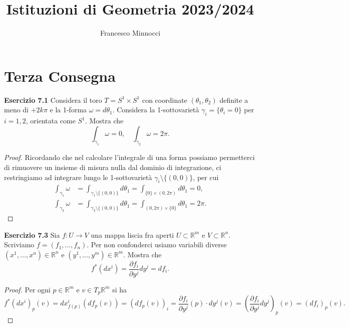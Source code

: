 \documentclass[a4paper]{article}
\title{Istituzioni di Geometria 2023/2024}
\author{Francesco Minnocci}
\newcommand{\R}{\mathbb{R}}
\theoremstyle{definition}
\theoremstyle{definition}
\theoremstyle{remark}
\theoremstyle{definition}
\begin{document}
\maketitle
\section*{Terza Consegna}
\textbf{Esercizio 7.1}
Considera il toro $T = S^1 \times S^1$ con coordinate $(\theta_1, \theta_2)$ definite a meno di $+2k\pi$ e la 1-forma $\omega = d\theta_1$. Considera la 1-sottovarietà $\gamma_i = \{\theta_i = 0\}$ per $i = 1, 2$, orientata come $S^1$. Mostra che
\[
    \int_{\gamma_1} \omega = 0,\quad\int_{\gamma_2} \omega = 2\pi.
\]

\begin{proof}
    Ricordando che nel calcolare l'integrale di una forma possiamo permetterci di rimuovere un insieme di misura nulla dal dominio di integrazione, ci restringiamo ad integrare lungo le 1-sottovarietà $\gamma_i \setminus \{(0, 0)\}$, per cui
    \[
        \begin{aligned}
            \int_{\gamma_1} \omega & = \int_{\gamma_1 \setminus \{(0, 0)\}} d\theta_1 = \int_{\{0\} \times (0, 2\pi)} d\theta_1 = 0,    \\
            \int_{\gamma_2} \omega & = \int_{\gamma_2 \setminus \{(0, 0)\}} d\theta_1 = \int_{(0, 2\pi) \times \{0\}} d\theta_1 = 2\pi.
        \end{aligned}
    \]
\end{proof}

\textbf{Esercizio 7.3}
Sia $f : U \to V$ una mappa liscia fra aperti $U \subset \R^m$ e $V \subset \R^n$. Scriviamo $f = (f_1, \ldots, f_n)$. Per non confonderci usiamo variabili diverse $(x^1, \ldots, x^n) \in \R^n$ e $(y^1, \ldots, y^m) \in \R^m$. Mostra che
\[
    f^*(dx^i) = \frac{\partial f_i}{\partial y^j} dy^j = df_i.
\]
\begin{proof}
    Per ogni $p\in \R^m$ e $v\in T_p\R^m$ si ha
    \[
        f^*(dx^i)_p(v) = dx^i_{f(p)}(df_p(v)) = (df_p(v))_i = \frac{\partial f_i}{\partial y^j}(p) \cdot dy^j(v) = \left(\frac{\partial f_i}{\partial y^j} dy^j\right)_p(v) = (df_i)_p(v).
    \]
\end{proof}
\end{document}
